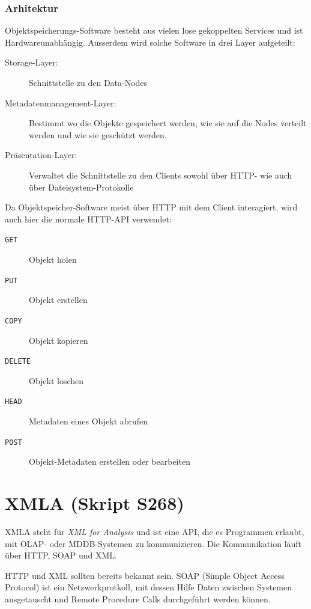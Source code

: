\documentclass[a4paper, 11pt, nofootinbib]{article}
\newcommand{\code}[1]{\texttt{#1}}
\begin{document}
\newpage

\subsubsection{Arhitektur}
Objektspeicherungs-Software besteht aus vielen lose gekoppelten Services und ist Hardwareunabhängig. Ausserdem wird solche Software in drei Layer aufgeteilt:

\begin{description}
	\item[Storage-Layer: ] Schnittstelle zu den Data-Nodes
	\item[Metadatenmanagement-Layer: ] Bestimmt wo die Objekte gespeichert werden, wie sie auf die Nodes verteilt werden und wie sie geschützt werden.
	\item[Präsentation-Layer: ] Verwaltet die Schnittstelle zu den Clients sowohl über HTTP- wie auch über Dateisystem-Protokolle
\end{description}

Da Objektspeicher-Software meist über HTTP mit dem Client interagiert, wird auch hier die normale HTTP-API verwendet:

\begin{description}
	\item[\code{GET}] Objekt holen
	\item[\code{PUT}] Objekt erstellen
	\item[\code{COPY}] Objekt kopieren
	\item[\code{DELETE}] Objekt löschen
	\item[\code{HEAD}] Metadaten eines Objekt abrufen
	\item[\code{POST}] Objekt-Metadaten erstellen oder bearbeiten
\end{description}

\newpage


\section{XMLA (Skript S268)}
XMLA steht für \textit{XML for Analysis} und ist eine API, die es Programmen erlaubt, mit OLAP- oder MDDB-Systemen zu kommunizieren. Die Kommunikation läuft über HTTP, SOAP und XML.

HTTP und XML sollten bereits bekannt sein. SOAP (Simple Object Access Protocol) ist ein Netzwerkprotkoll, mit dessen Hilfe Daten zwischen Systemen ausgetauscht und Remote Procedure Calls durchgeführt werden können.
\end{document}
